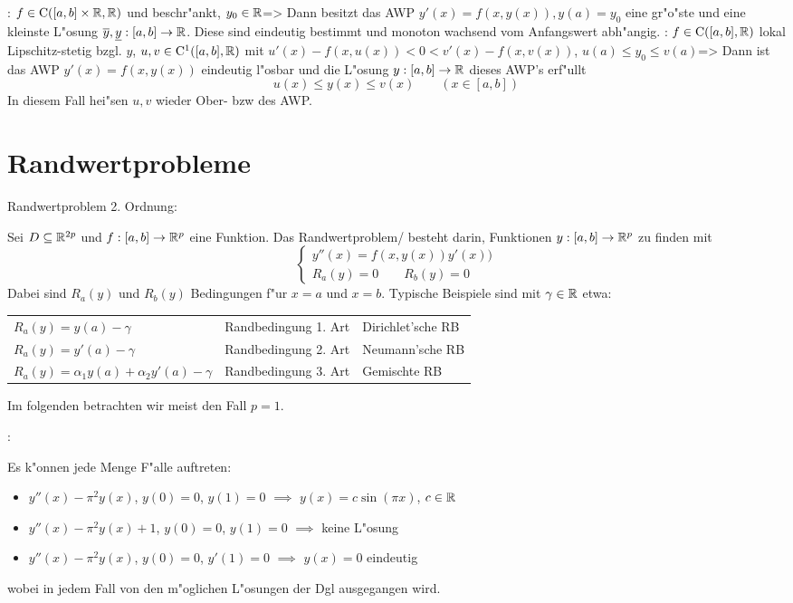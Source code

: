\theorem:
  $f\in{\rm C}([a,b]\times\mathbb R,\mathbb R)$ und beschr"ankt, $y_0\in\mathbb R$=>{
  \label{the:ode-extremal-weak}
  Dann besitzt das AWP $y'(x)=f(x,y(x)),y(a)=y_0$ eine gr"o"ste und
  eine kleinste L"osung $\overline y,\underline y:[a,b]\to\mathbb R$. Diese
  sind eindeutig bestimmt und monoton wachsend vom Anfangswert abh"angig.
  }
\lessertheorem:
  $f\in{\rm C}([a,b],\mathbb R)$ lokal Lipschitz-stetig bzgl. $y$,
  $u,v\in{\rm C}^1([a,b],\mathbb R)$ mit $u'(x)-f(x,u(x))<0<v'(x)-f(x,v(x))$,
  $u(a)\leq y_0\leq v(a)$=>{
  Dann ist das AWP $y'(x)=f(x,y(x))$ eindeutig l"osbar und die L"osung 
  $y:[a,b]\to\mathbb R$ dieses AWP's erf"ullt
  \[u(x)\leq y(x)\leq v(x) \qquad (x\in[a,b])
    \]
  In diesem Fall hei"sen $u,v$ wieder Ober- bzw 
   des AWP.
  }
\section{Randwertprobleme}
 Randwertproblem 2. Ordnung:{
  Sei $D\subseteq\mathbb R^{2p}$ und $f:[a,b]\to\mathbb R^p$ eine Funktion.
  Das Randwertproblem/ besteht darin, Funktionen 
  $y:[a,b]\to\mathbb R^p$ zu finden mit
  \[\left\{\begin{array}{l}
      y''(x)=f(x,y(x))y'(x))\\
      R_a(y)=0\qquad R_b(y)=0
      \end{array}\right.
    \]
  Dabei sind $R_a(y)$ und $R_b(y)$ Bedingungen f"ur $x=a$ und $x=b$.
  Typische Beispiele sind mit $\gamma\in\mathbb R$ etwa:
  \begin{center}\begin{tabular}{lll}
    $R_a(y)=y(a)-\gamma$ & Randbedingung 1. Art & Dirichlet'sche RB \\
    $R_a(y)=y'(a)-\gamma$ & Randbedingung 2. Art & Neumann'sche RB \\
    $R_a(y)=\alpha_1y(a)+\alpha_2y'(a)-\gamma$ & Randbedingung 3. Art 
      & Gemischte RB
    \end{tabular}\end{center}
  Im folgenden betrachten wir meist den Fall $p=1$.
  }
\example:{
  Es k"onnen jede Menge F"alle auftreten:
  \begin{itemize}
    \item $y''(x)-\pi^2y(x)$, $y(0)=0$, $y(1)=0$ 
      $\implies$ $y(x)=c\sin(\pi x)$, $c\in\mathbb R$
    \item $y''(x)-\pi^2y(x)+1$, $y(0)=0$, $y(1)=0$ 
      $\implies$ keine L"osung
    \item $y''(x)-\pi^2y(x)$, $y(0)=0$, $y'(1)=0$ 
      $\implies$ $y(x)=0$ eindeutig
    \end{itemize}
  wobei in jedem Fall von den m"oglichen L"osungen der Dgl ausgegangen
  wird.  
  }
